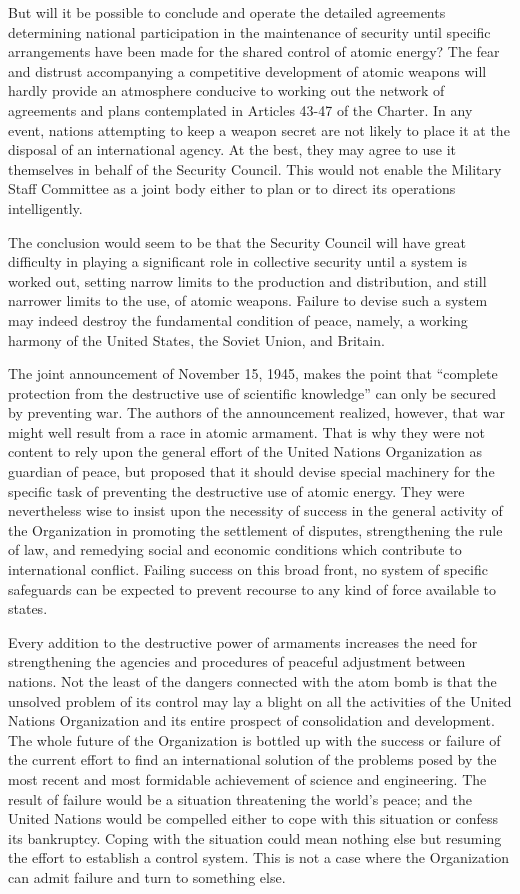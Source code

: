 But will it be possible to conclude and operate the detailed agreements determining national participation in the maintenance of security until specific arrangements have been made for the shared control of atomic energy? The fear and distrust accompanying a competitive development of atomic weapons will hardly provide an atmosphere conducive to working out the network of agreements and plans contemplated in Articles 43-47 of the Charter. In any event, nations attempting to keep a weapon secret are not likely to place it at the disposal of an international agency. At the best, they may agree to use it themselves in behalf of the Security Council. This would not enable the Military Staff Committee as a joint body either to plan or to direct its operations intelligently.

The conclusion would seem to be that the Security Council will have great difficulty in playing a significant role in collective security until a system is worked out, setting narrow limits to the production and distribution, and still narrower limits to the use, of atomic weapons. Failure to devise such a system may indeed destroy the fundamental condition of peace, namely, a working harmony of the United States, the Soviet Union, and Britain.

The joint announcement of November 15, 1945, makes the point that ``complete protection from the destructive use of scientific knowledge'' can only be secured by preventing war. The authors of the announcement realized, however, that war might well result from a race in atomic armament. That is why they were not content to rely upon the general effort of the United Nations Organization as guardian of peace, but proposed that it should devise special machinery for the specific task of preventing the destructive use of atomic energy. They were nevertheless wise to insist upon the necessity of success in the general activity of the Organization in promoting the settlement of disputes, strengthening the rule of law, and remedying social and economic conditions which contribute to international conflict. Failing success on this broad front, no system of specific safeguards can be expected to prevent recourse to any kind of force available to states.

Every addition to the destructive power of armaments increases the need for strengthening the agencies and procedures of peaceful adjustment between nations. Not the least of the dangers connected with the atom bomb is that the unsolved problem of its control may lay a blight on all the activities of the United Nations Organization and its entire prospect of consolidation and development. The whole future of the Organization is bottled up with the success or failure of the current effort to find an international solution of the problems posed by the most recent and most formidable achievement of science and engineering. The result of failure would be a situation threatening the world's peace; and the United Nations would be compelled either to cope with this situation or confess its bankruptcy. Coping with the situation could mean nothing else but resuming the effort to establish a control system. This is not a case where the Organization can admit failure and turn to something else.

